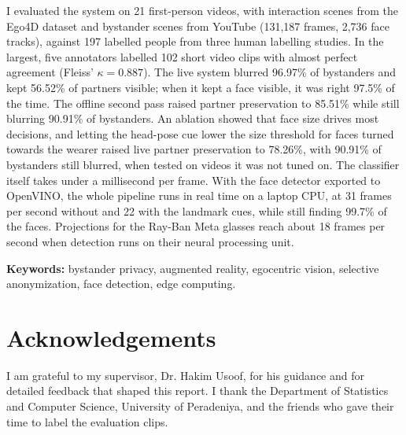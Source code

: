I evaluated the system on 21 first-person videos, with interaction scenes from the
Ego4D dataset and bystander scenes from YouTube (131,187 frames, 2,736 face tracks),
against 197 labelled people from three human labelling studies. In the
largest, five annotators labelled 102 short video clips with almost perfect agreement
(Fleiss' $\kappa = 0.887$). The live system blurred 96.97\% of bystanders and kept
56.52\% of partners visible; when it kept a face visible, it was right 97.5\% of the
time. The offline second pass raised partner preservation to 85.51\% while still
blurring 90.91\% of bystanders. An ablation showed that face size drives most
decisions, and letting the head-pose cue lower the size threshold for faces turned towards
the wearer raised live partner preservation to 78.26\%, with 90.91\% of bystanders still
blurred, when tested on videos it was not tuned on. The classifier
itself takes under a millisecond per frame. With the face detector exported to OpenVINO,
the whole pipeline runs in real time on a laptop CPU, at 31 frames per second without and
22 with the landmark cues, while still finding 99.7\% of the faces. Projections for the
Ray-Ban Meta glasses reach about 18 frames per second when detection runs on their neural
processing unit.

\textbf{Keywords:} bystander privacy, augmented reality, egocentric vision, selective
anonymization, face detection, edge computing.

\clearpage
\section*{Acknowledgements}

I am grateful to my supervisor, Dr. Hakim Usoof, for his guidance and for detailed
feedback that shaped this report. I thank the Department of Statistics and Computer
Science, University of Peradeniya, and the friends who gave their time to label the
evaluation clips.
